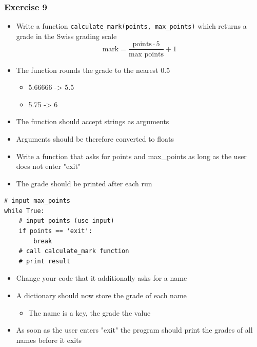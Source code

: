 \documentclass[10pt, a4paper]{beamer} %
\begin{document}
{
\bfseries
\begin{frame}\frametitle{Exercise 9}
    
\begin{itemize}
    \item Write a function \texttt{calculate\_mark(points, max\_points)} which returns a grade in the Swiss grading scale
    \[ \text{mark} = \frac{\text{points}\cdot 5}{\text{max points}} + 1 \]
    \item The function rounds the grade to the nearest 0.5
    \begin{itemize}
        \item 5.66666 -> 5.5
        \item 5.75 -> 6
    \end{itemize}
    \item The function should accept strings as arguments
    \item Arguments should be therefore converted to floats
\end{itemize}

\framebreak

\begin{itemize}
    \item Write a function that asks for points and max\_points as long as the user does not enter "exit"
    \item The grade should be printed after each run
\end{itemize}

{
\mdseries
{}
\begin{lstlisting}
# input max_points
while True:
    # input points (use input)
    if points == 'exit':
        break
    # call calculate_mark function
    # print result
\end{lstlisting}
}
\framebreak

\begin{itemize}
    \item Change your code that it additionally asks for a name
    \item A dictionary should now store the grade of each name
    \begin{itemize}
        \item The name is a key, the grade the value
    \end{itemize}
    \item As soon as the user enters "exit" the program should print the grades of all names before it exits
\end{itemize}


\end{frame}}
\end{document}

